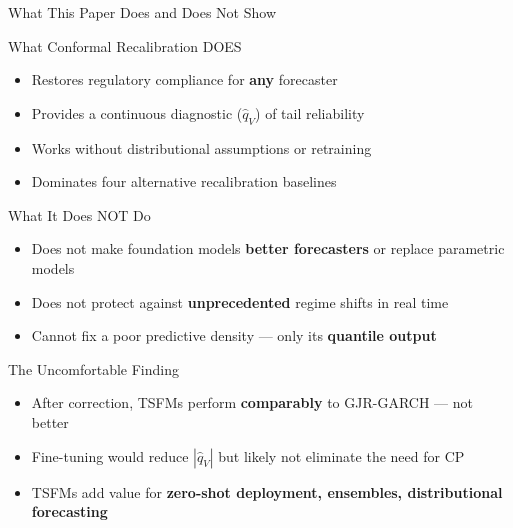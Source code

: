 \documentclass[9pt, aspectratio=169, t]{beamer}
\newcommand{\qV}{\hat{q}_V}
\begin{document}
\begin{frame}{What This Paper Does and Does Not Show}
	\vspace{-0.3cm}
	{\tiny
	\begin{exampleblock}{What Conformal Recalibration DOES}
		\begin{itemize}\setlength{\itemsep}{0pt}
			\item Restores regulatory compliance for \textbf{any} forecaster
			\item Provides a continuous diagnostic ($\qV$) of tail reliability
			\item Works without distributional assumptions or retraining
			\item Dominates four alternative recalibration baselines
		\end{itemize}
	\end{exampleblock}
	\begin{alertblock}{What It Does NOT Do}
		\begin{itemize}\setlength{\itemsep}{0pt}
			\item Does not make foundation models \textbf{better forecasters} or replace parametric models
			\item Does not protect against \textbf{unprecedented} regime shifts in real time
			\item Cannot fix a poor predictive density --- only its \textbf{quantile output}
		\end{itemize}
	\end{alertblock}
	\begin{exampleblock}{The Uncomfortable Finding}
		\begin{itemize}\setlength{\itemsep}{0pt}
			\item After correction, TSFMs perform \textbf{comparably} to GJR-GARCH --- not better
			\item Fine-tuning would reduce $|\qV|$ but likely not eliminate the need for CP
			\item TSFMs add value for \textbf{zero-shot deployment, ensembles, distributional forecasting}
		\end{itemize}
	\end{exampleblock}
	}
\end{frame}

\end{document}
